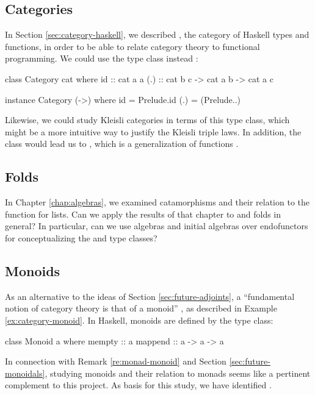 \subsection{Categories}
\label{sec:future-categories}

In Section \ref{sec:category-haskell}, we described \hask, the
category of Haskell types and functions, in order to be able to relate
category theory to functional programming. We could use the
 type class instead
\parencites[49--51]{yorgey-2009}[74--75]{elkins-2009}:
\begin{codehaskell}
class Category cat where
  id  :: cat a a
  (.) :: cat b c -> cat a b -> cat a c

instance Category (->) where
  id  = Prelude.id
  (.) = (Prelude..)
\end{codehaskell}
Likewise, we could study Kleisli categories
\parencite[59--60]{moggi-1991} in terms of this type class, which
might be a more intuitive way to justify the Kleisli triple laws. In
addition, the  class would lead us to
, which is a generalization of functions
\parencite[51--57]{yorgey-2009}.

\subsection{Folds}

In Chapter \ref{chap:algebras}, we examined catamorphisms and their
relation to the  function for lists. Can we apply
the results of that chapter to  and folds in
general? In particular, can we use algebras and initial algebras over
endofunctors for conceptualizing the 
\parencite[44--47]{yorgey-2009} and 
\parencites[§ 3]{mcbride-paterson-2008}[47--49]{yorgey-2009} type
classes?

\subsection{Monoids}
\label{sec:future-monoids}

As an alternative to the ideas of Section \ref{sec:future-adjoints}, a
``fundamental notion of category theory is that of a monoid''
\parencite[vii]{maclane-1998}, as described in Example
\ref{ex:category-monoid}. In Haskell, monoids are defined by the
 type class:
\begin{codehaskell}
class Monoid a where
  mempty  :: a
  mappend :: a -> a -> a
\end{codehaskell}
In connection with Remark \ref{re:monad-monoid} and Section
\ref{sec:future-monoidals}, studying monoids and their relation to
monads seems like a pertinent complement to this project. As basis for
this study, we have identified \parencites[§
  VII]{maclane-1998}[39--44]{yorgey-2009}.

\clearemptydoublepage

